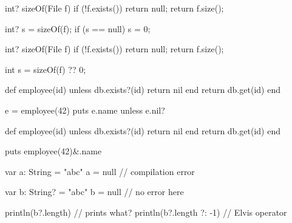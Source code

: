\documentclass{article}
\begin{document}
\begin{lnSnippet}
int? sizeOf(File f) {
  if (!f.exists()) {
    return null;
  }
  return f.size();
}

int? s = sizeOf(f);
if (s == null) {
  s = 0;
}
\end{lnSnippet}
\begin{lnSnippet}
int? sizeOf(File f) {
  if (!f.exists()) {
    return null;
  }
  return f.size();
}

int s = sizeOf(f) ?? 0;
\end{lnSnippet}

\begin{lnSnippet}
def employee(id)
  unless db.exists?(id)
    return nil
  end
  return db.get(id)
end

e = employee(42)
puts e.name unless e.nil?
\end{lnSnippet}
\begin{lnSnippet}
def employee(id)
  unless db.exists?(id)
    return nil
  end
  return db.get(id)
end

puts employee(42)&.name
\end{lnSnippet}

\begin{lnSnippet}
var a: String = "abc"
a = null // compilation error

var b: String? = "abc"
b = null // no error here

println(b?.length) // prints what?
println(b?.length ?: -1) // Elvis operator
\end{lnSnippet}
\end{document}
